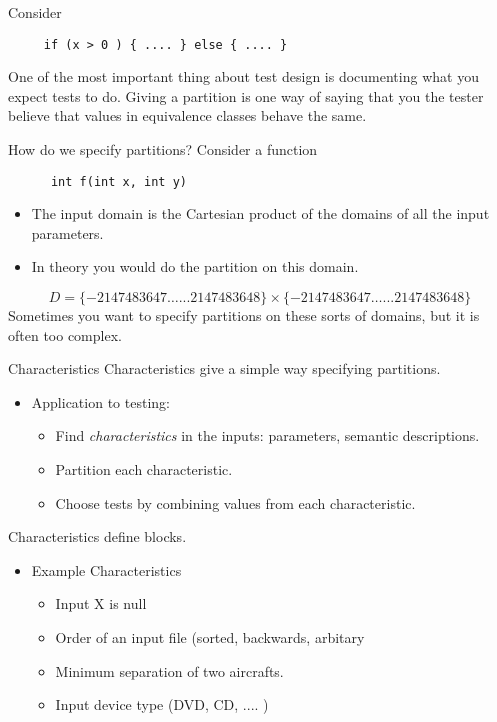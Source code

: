 \documentclass{beamer}
\begin{document}
\begin{frame}[fragile]
 Consider 
  \begin{lstlisting}
     if (x > 0 ) { .... } else { .... }
  \end{lstlisting}
 One of the most important thing about test design is documenting
 what you expect tests to do. Giving a partition is one way of saying
 that you the tester believe that values in equivalence classes behave
 the same.
\end{frame}

\begin{frame}[fragile]{How do we specify partitions?}
  Consider a function
  \begin{lstlisting}
      int f(int x, int y)
    \end{lstlisting}
    \begin{itemize}
    \item The input domain is the Cartesian product of the domains of all the
      input parameters.
    \item In theory you would do the partition on this domain.
    \end{itemize}
    \[
      D = \{ -2147483647 \ldots ... 2147483648\}\times \{ -2147483647
      \ldots ... 2147483648\}
    \]
Sometimes you want to specify partitions on these sorts of domains,
but it is often too complex. 
\end{frame}
\begin{frame}{Characteristics}
 Characteristics give a simple way specifying partitions. 
  \begin{itemize}
  \item Application to testing:
    \begin{itemize}
    \item Find {\em characteristics} in the inputs: parameters,
      semantic descriptions.
    \item Partition each characteristic.
    \item Choose tests by combining values from each characteristic.
    \end{itemize}
  \end{itemize}
  Characteristics define blocks.
\end{frame}
\begin{frame}
  \begin{itemize}
  \item Example Characteristics
    \begin{itemize}
    \item Input X is null
    \item Order of an input file (sorted, backwards, arbitary
    \item Minimum separation of two aircrafts.
    \item Input device type (DVD, CD, .... )
    \end{itemize}
  \end{itemize}
\end{frame}
\end{document}
